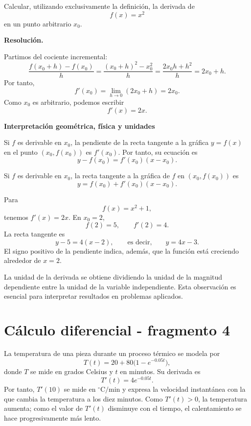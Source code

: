\begin{solvedexercise}
Calcular, utilizando exclusivamente la definición, la derivada de
\[
f(x)=x^2
\]
en un punto arbitrario $x_0$.

\textbf{Resolución.}\par\smallskip
Partimos del cociente incremental:
\[
\frac{f(x_0+h)-f(x_0)}{h}
=
\frac{(x_0+h)^2-x_0^2}{h}
=
\frac{2x_0h+h^2}{h}
=2x_0+h.
\]
Por tanto,
\[
f'(x_0)=\lim_{h\to0}(2x_0+h)=2x_0.
\]
Como $x_0$ es arbitrario, podemos escribir
\[
f'(x)=2x.
\]
\end{solvedexercise}

\textbf{Interpretación geométrica, física y unidades}

Si $f$ es derivable en $x_0$, la pendiente de la recta tangente a la gráfica $y=f(x)$ en el punto $(x_0,f(x_0))$ es $f'(x_0)$. Por tanto, su ecuación es
\[
y-f(x_0)=f'(x_0)(x-x_0).
\]

\begin{definition}
Si $f$ es derivable en $x_0$, la recta tangente a la gráfica de $f$ en $(x_0,f(x_0))$ es
\[
\boxed{\ y=f(x_0)+f'(x_0)(x-x_0).\ }
\]
\end{definition}

\begin{example}
Para
\[
f(x)=x^2+1,
\]
tenemos $f'(x)=2x$. En $x_0=2$,
\[
f(2)=5,
\qquad
f'(2)=4.
\]
La recta tangente es
\[
y-5=4(x-2),
\qquad\text{es decir,}\qquad
 y=4x-3.
\]
El signo positivo de la pendiente indica, además, que la función está creciendo alrededor de $x=2$.
\end{example}

La unidad de la derivada se obtiene dividiendo la unidad de la magnitud dependiente entre la unidad de la variable independiente. Esta observación es esencial para interpretar resultados en problemas aplicados.


\section{Cálculo diferencial - fragmento 4}
\begin{example}
La temperatura de una pieza durante un proceso térmico se modela por
\[
T(t)=20+80\bigl(1-e^{-0.05t}\bigr),
\]
donde $T$ se mide en grados Celsius y $t$ en minutos. Su derivada es
\[
T'(t)=4e^{-0.05t}.
\]
Por tanto, $T'(10)$ se mide en $^{\circ}\mathrm{C}/\mathrm{min}$ y expresa la velocidad instantánea con la que cambia la temperatura a los diez minutos. Como $T'(t)>0$, la temperatura aumenta; como el valor de $T'(t)$ disminuye con el tiempo, el calentamiento se hace progresivamente más lento.
\end{example}

